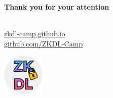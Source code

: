 \documentclass{zkdl-presentation-template}
\begin{document}
    \begin{frame}
        \centering
        \LARGE
        \textbf{Thank you for your attention} \\
        
        \vspace{0.2cm} \Huge {} \large \\
        
        \vspace{1cm}
  
        \href{https://zkdl-camp.github.io/}{\hspace{.325em}zkdl-camp.github.io} \\
  
        \href{https://github.com/ZKDL-Camp}{\hspace{.325em}github.com/ZKDL-Camp}
        
        \begin{center}
            \includegraphics[width=0.15\textwidth]{images/logo.png}
        \end{center}
    \end{frame}
\end{document}
